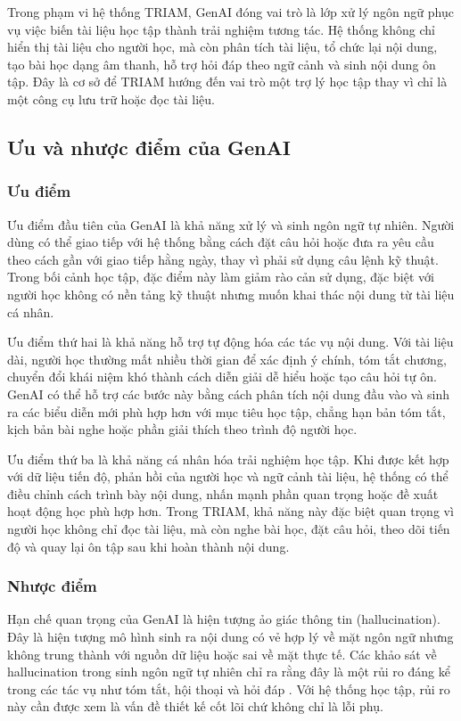\documentclass[12pt,a4paper]{report}
\begin{document}
Trong phạm vi hệ thống TRIAM, GenAI đóng vai trò là lớp xử lý ngôn ngữ phục vụ việc biến tài liệu học tập thành trải nghiệm tương tác. Hệ thống không chỉ hiển thị tài liệu cho người học, mà còn phân tích tài liệu, tổ chức lại nội dung, tạo bài học dạng âm thanh, hỗ trợ hỏi đáp theo ngữ cảnh và sinh nội dung ôn tập. Đây là cơ sở để TRIAM hướng đến vai trò một trợ lý học tập thay vì chỉ là một công cụ lưu trữ hoặc đọc tài liệu.

\subsection{Ưu và nhược điểm của GenAI}

\subsubsection{Ưu điểm}

Ưu điểm đầu tiên của GenAI là khả năng xử lý và sinh ngôn ngữ tự nhiên. Người dùng có thể giao tiếp với hệ thống bằng cách đặt câu hỏi hoặc đưa ra yêu cầu theo cách gần với giao tiếp hằng ngày, thay vì phải sử dụng câu lệnh kỹ thuật. Trong bối cảnh học tập, đặc điểm này làm giảm rào cản sử dụng, đặc biệt với người học không có nền tảng kỹ thuật nhưng muốn khai thác nội dung từ tài liệu cá nhân.

Ưu điểm thứ hai là khả năng hỗ trợ tự động hóa các tác vụ nội dung. Với tài liệu dài, người học thường mất nhiều thời gian để xác định ý chính, tóm tắt chương, chuyển đổi khái niệm khó thành cách diễn giải dễ hiểu hoặc tạo câu hỏi tự ôn. GenAI có thể hỗ trợ các bước này bằng cách phân tích nội dung đầu vào và sinh ra các biểu diễn mới phù hợp hơn với mục tiêu học tập, chẳng hạn bản tóm tắt, kịch bản bài nghe hoặc phần giải thích theo trình độ người học.

Ưu điểm thứ ba là khả năng cá nhân hóa trải nghiệm học tập. Khi được kết hợp với dữ liệu tiến độ, phản hồi của người học và ngữ cảnh tài liệu, hệ thống có thể điều chỉnh cách trình bày nội dung, nhấn mạnh phần quan trọng hoặc đề xuất hoạt động học phù hợp hơn. Trong TRIAM, khả năng này đặc biệt quan trọng vì người học không chỉ đọc tài liệu, mà còn nghe bài học, đặt câu hỏi, theo dõi tiến độ và quay lại ôn tập sau khi hoàn thành nội dung.

\subsubsection{Nhược điểm}

Hạn chế quan trọng của GenAI là hiện tượng ảo giác thông tin (hallucination). Đây là hiện tượng mô hình sinh ra nội dung có vẻ hợp lý về mặt ngôn ngữ nhưng không trung thành với nguồn dữ liệu hoặc sai về mặt thực tế. Các khảo sát về hallucination trong sinh ngôn ngữ tự nhiên chỉ ra rằng đây là một rủi ro đáng kể trong các tác vụ như tóm tắt, hội thoại và hỏi đáp \cite{ji2023hallucinationSurvey}. Với hệ thống học tập, rủi ro này cần được xem là vấn đề thiết kế cốt lõi chứ không chỉ là lỗi phụ.
\end{document}
